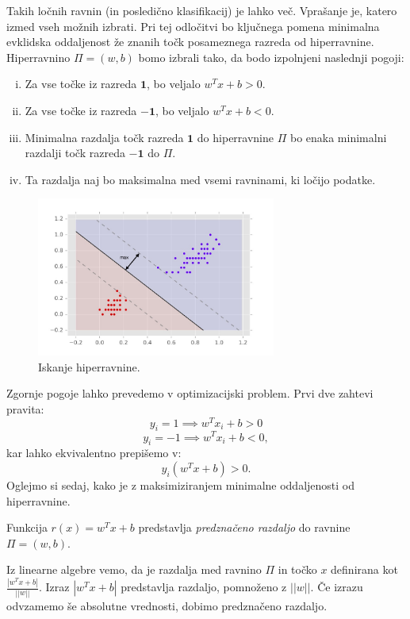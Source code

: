 \documentclass[mat1]{fmfdelo}
\newcommand{\pr}{\mathbf 1}
\newcommand{\nr}{\mathbf {-1}}
\begin{document}
Takih ločnih ravnin (in posledično klasifikacij) je lahko več. Vprašanje je, katero izmed vseh možnih izbrati. Pri tej odločitvi bo ključnega pomena minimalna evklidska oddaljenost že znanih točk posameznega razreda od hiperravnine. Hiperravnino $\Pi = (w, b)$ bomo izbrali tako, da bodo izpolnjeni naslednji pogoji: 
\begin{enumerate}[(i)]
	\item 
	Za vse točke iz razreda $\pr$, bo veljalo $w^Tx+ b > 0$.
	\item 
	Za vse točke iz razreda $\nr$, bo veljalo $w^Tx+ b < 0$.
	\item 
	Minimalna razdalja točk razreda $\pr$ do hiperravnine $\Pi$ bo enaka minimalni razdalji točk razreda $\nr$ do $\Pi$.
	\item 
	Ta razdalja naj bo maksimalna med vsemi ravninami, ki ločijo podatke.
\end{enumerate}
\begin{figure}[ht]
	\centering
	\includegraphics[width=0.7\textwidth]{slike/LinearnoLocljiviIskanjeHiperravnine.jpg}
	\caption{Iskanje hiperravnine.}
	\label{slikaIskanjeHiperravnine}
\end{figure}



Zgornje pogoje lahko prevedemo v optimizacijski problem. Prvi dve zahtevi pravita: 
$$y_i = 1 \implies w^Tx_i+ b > 0$$
$$y_i = -1 \implies  w^Tx_i+ b < 0,$$
kar lahko ekvivalentno prepišemo v: 
$$  y_i(w^Tx+ b)> 0.$$
Oglejmo si sedaj, kako je z maksimiziranjem minimalne oddaljenosti od hiperravnine. 

\begin{definicija}
	Funkcija $r(x) = w^Tx + b$ predstavlja \emph{predznačeno razdaljo} do ravnine $\Pi= (w, b)$. 
\end{definicija}

Iz linearne algebre vemo, da je razdalja med ravnino $\Pi$ in točko $x$ definirana kot $\frac{|w^Tx+ b|}{||w||}$. Izraz $|w^Tx+ b|$ predstavlja razdaljo, pomnoženo z $||w||$. Če izrazu odvzamemo še absolutne vrednosti, dobimo predznačeno razdaljo. 
\end{document}
